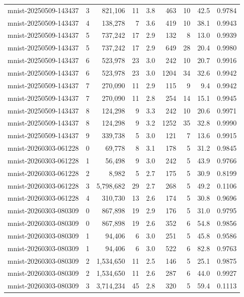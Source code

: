 \begin{tabular}{llrrrrrrr}
mnist-20250509-143437 & 3 & 821,106 & 11 & 3.8 & 463 & 10 & 42.5 & 0.9784 \\
mnist-20250509-143437 & 4 & 138,278 & 7 & 3.6 & 419 & 10 & 38.1 & 0.9943 \\
mnist-20250509-143437 & 5 & 737,242 & 17 & 2.9 & 132 & 8 & 13.0 & 0.9939 \\
mnist-20250509-143437 & 5 & 737,242 & 17 & 2.9 & 649 & 28 & 20.4 & 0.9980 \\
mnist-20250509-143437 & 6 & 523,978 & 23 & 3.0 & 242 & 10 & 20.7 & 0.9916 \\
mnist-20250509-143437 & 6 & 523,978 & 23 & 3.0 & 1204 & 34 & 32.6 & 0.9942 \\
mnist-20250509-143437 & 7 & 270,090 & 11 & 2.9 & 115 & 9 & 9.4 & 0.9942 \\
mnist-20250509-143437 & 7 & 270,090 & 11 & 2.8 & 254 & 14 & 15.1 & 0.9945 \\
mnist-20250509-143437 & 8 & 124,298 & 9 & 3.3 & 242 & 10 & 20.6 & 0.9971 \\
mnist-20250509-143437 & 8 & 124,298 & 9 & 3.2 & 1252 & 35 & 32.8 & 0.9990 \\
mnist-20250509-143437 & 9 & 339,738 & 5 & 3.0 & 121 & 7 & 13.6 & 0.9915 \\
mnist-20260303-061228 & 0 & 69,778 & 8 & 3.1 & 178 & 5 & 31.2 & 0.9845 \\
mnist-20260303-061228 & 1 & 56,498 & 9 & 3.0 & 242 & 5 & 43.9 & 0.9766 \\
mnist-20260303-061228 & 2 & 8,982 & 5 & 2.7 & 175 & 5 & 30.9 & 0.8199 \\
mnist-20260303-061228 & 3 & 5,798,682 & 29 & 2.7 & 268 & 5 & 49.2 & 0.1106 \\
mnist-20260303-061228 & 4 & 310,730 & 13 & 2.6 & 174 & 5 & 30.8 & 0.9696 \\
mnist-20260303-080309 & 0 & 867,898 & 19 & 2.9 & 176 & 5 & 31.0 & 0.9795 \\
mnist-20260303-080309 & 0 & 867,898 & 19 & 2.6 & 352 & 6 & 54.8 & 0.9856 \\
mnist-20260303-080309 & 1 & 94,406 & 6 & 3.0 & 251 & 5 & 45.8 & 0.9586 \\
mnist-20260303-080309 & 1 & 94,406 & 6 & 3.0 & 522 & 6 & 82.8 & 0.9763 \\
mnist-20260303-080309 & 2 & 1,534,650 & 11 & 2.5 & 146 & 5 & 25.1 & 0.9875 \\
mnist-20260303-080309 & 2 & 1,534,650 & 11 & 2.6 & 287 & 6 & 44.0 & 0.9927 \\
mnist-20260303-080309 & 3 & 3,714,234 & 45 & 2.8 & 320 & 5 & 59.4 & 0.1113 \\

\end{tabular}
